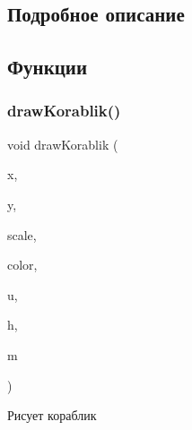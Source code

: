 \subsection{Подробное описание}


\subsection{Функции}
\hypertarget{group___xD0_x9E_xD0_xB7_xD0_xB5_xD1_x80_xD0_xBE___xD0_xBA_xD0_xBE_xD1_x80_xD0_xB0_xD0_xB1_xD0_xBB_xD0_xB8_xD0_xBA_gaa5f04a811e13c12ff31d58f8ee9b25cf}{}\label{group___xD0_x9E_xD0_xB7_xD0_xB5_xD1_x80_xD0_xBE___xD0_xBA_xD0_xBE_xD1_x80_xD0_xB0_xD0_xB1_xD0_xBB_xD0_xB8_xD0_xBA_gaa5f04a811e13c12ff31d58f8ee9b25cf} 
\subsubsection{\texorpdfstring{draw\+Korablik()}{drawKorablik()}}
{\footnotesize\ttfamily void draw\+Korablik (\begin{DoxyParamCaption}\item[{int}]{x,  }\item[{int}]{y,  }\item[{double}]{scale,  }\item[{C\+O\+L\+O\+R\+R\+EF}]{color,  }\item[{int}]{u,  }\item[{int}]{h,  }\item[{int}]{m }\end{DoxyParamCaption})}



Рисует кораблик 



